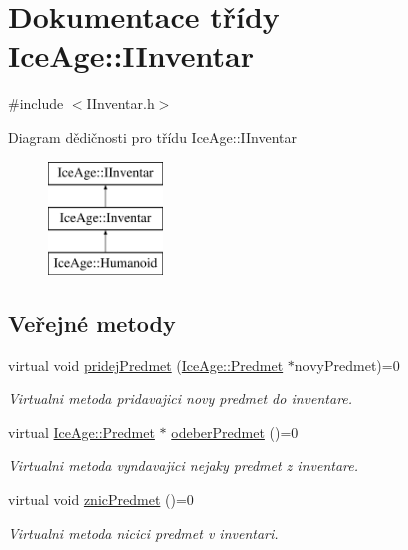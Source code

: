 \hypertarget{classIceAge_1_1IInventar}{}\section{Dokumentace třídy Ice\+Age\+:\+:I\+Inventar}
\label{classIceAge_1_1IInventar}


{\ttfamily \#include $<$I\+Inventar.\+h$>$}

Diagram dědičnosti pro třídu Ice\+Age\+:\+:I\+Inventar\begin{figure}[H]
\begin{center}
\leavevmode
\includegraphics[height=3.000000cm]{d2/dde/classIceAge_1_1IInventar}
\end{center}
\end{figure}
\subsection*{Veřejné metody}
\begin{DoxyCompactItemize}
\item 
virtual void \hyperlink{classIceAge_1_1IInventar_a248376e6235356142020eed0373caf45}{pridej\+Predmet} (\hyperlink{classIceAge_1_1Predmet}{Ice\+Age\+::\+Predmet} $\ast$novy\+Predmet)=0
\begin{DoxyCompactList}\small\item\em Virtualni metoda pridavajici novy predmet do inventare. \end{DoxyCompactList}\item 
virtual \hyperlink{classIceAge_1_1Predmet}{Ice\+Age\+::\+Predmet} $\ast$ \hyperlink{classIceAge_1_1IInventar_ab1da82e4f21c19afbdb86017ed784d84}{odeber\+Predmet} ()=0
\begin{DoxyCompactList}\small\item\em Virtualni metoda vyndavajici nejaky predmet z inventare. \end{DoxyCompactList}\item 
virtual void \hyperlink{classIceAge_1_1IInventar_a9ce63c75e643d7cbb6ab2e50a171a747}{znic\+Predmet} ()=0
\begin{DoxyCompactList}\small\item\em Virtualni metoda nicici predmet v inventari. \end{DoxyCompactList}\end{DoxyCompactItemize}
